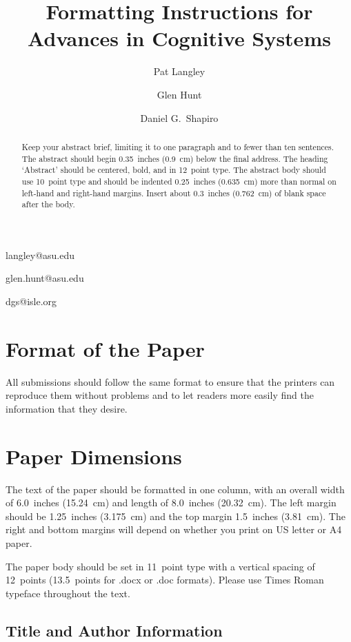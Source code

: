 \documentclass[11pt,letterpaper]{article}
\begin{document}
 

\title{Formatting Instructions for Advances in Cognitive Systems}
 
\author{Pat Langley}{langley@asu.edu}
\author{Glen Hunt}{glen.hunt@asu.edu}
\address{Computing Science and Engineering, Arizona State University, 
         Tempe, AZ 85287 USA}
\author{Daniel G.\ Shapiro}{dgs@isle.org}
\address{Institute for the Study of Learning and Expertise, 
         2164 Staunton Court, Palo Alto, CA 94306 USA}
\vskip 0.2in
 
\begin{abstract}Keep your abstract brief, limiting it to one paragraph 
and to fewer than ten sentences. The abstract should begin 0.35~inches 
(0.9~cm) below the final address. The heading `Abstract' should be
centered, bold, and in 12~point type. The abstract body should use
10~point type and should be indented 0.25~inches (0.635~cm) more than
normal on left-hand and right-hand margins. Insert about 0.3~inches 
(0.762~cm) of blank space after the body.
\end{abstract}

\section{Format of the Paper} 
 
All submissions should follow the same format to ensure that the 
printers can reproduce them without problems and to let readers 
more easily find the information that they desire.

\section{Paper Dimensions}

The text of the paper should be formatted in one column, with an
overall width of 6.0~inches (15.24~cm) and length of 8.0~inches 
(20.32~cm). The left margin should be 1.25~inches (3.175~cm) and the 
top margin 1.5~inches (3.81~cm). The right and bottom margins will
depend on whether you print on US letter or A4 paper.

The paper body should be set in 11~point type with a vertical spacing 
of 12~points (13.5~points for .docx or .doc formats). 
Please use Times Roman typeface throughout the text. 

\subsection{Title and Author Information}
\end{document}
